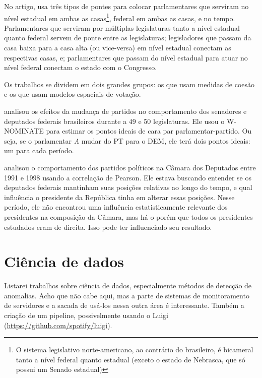No artigo,  usa três tipos de pontes para colocar
parlamentares que serviram no nível estadual em ambas as casas\footnote{O
sistema legislativo norte-americano, ao contrário do brasileiro, é bicameral
tanto a nível federal quanto estadual (exceto o estado de Nebrasca, que só
possui um Senado estadual)}, federal em ambas as casas, e no tempo.
Parlamentares que serviram por múltiplas legislaturas tanto a nível estadual
quanto federal servem de ponte entre as legislaturas; legisladores que passam
da casa baixa para a casa alta (ou vice-versa) em nível estadual conectam as
respectivas casas, e; parlamentares que passam do nível estadual para atuar no
nível federal conectam o estado com o Congresso.

Os trabalhos se dividem em dois grandes grupos: os que usam medidas de coesão e
os que usam modelos espaciais de votação.


 analisou os efeitos da mudança de partidos no
comportamento dos senadores e deputados federais brasileiros durante a
49\textordfeminine{} e 50\textordfeminine{} legislaturas. Ele usou o W-NOMINATE
para estimar os pontos ideais de cara par parlamentar-partido. Ou seja, se o
parlamentar \emph{A} mudar do PT para o DEM, ele terá dois pontos ideais: um
para cada período.

 analisou o comportamento dos partidos políticos na
Câmara dos Deputados entre 1991 e 1998 usando a correlação de Pearson. Ele
estava buscando entender se os deputados federais mantinham suas posições
relativas ao longo do tempo, e qual influência o presidente da República tinha
em alterar essas posições. Nesse período, ele não encontrou uma influência
estatisticamente relevante dos presidentes na composição da Câmara, mas há o
porém que todos os presidentes estudados eram de direita. Isso pode ter
influenciado seu resultado.

\section{Ciência de dados}

Listarei trabalhos sobre ciência de dados, especialmente métodos de detecção de anomalias. Acho que não cabe aqui, mas a parte de sistemas de monitoramento de servidores e a sacada de usá-los nessa outra área é interessante. Também a criação de um pipeline, possivelmente usando o Luigi (\url{https://github.com/spotify/luigi}).

